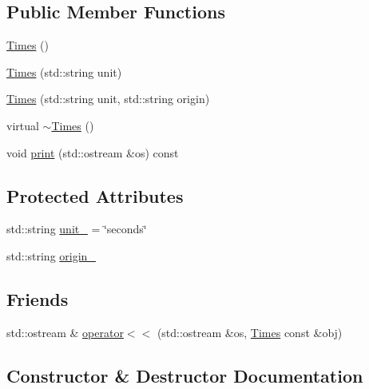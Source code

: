 \subsection*{Public Member Functions}
\begin{DoxyCompactItemize}
\item 
\mbox{\hyperlink{class_times_a8ba246100f3c12f80abeb3beb93446f6}{Times}} ()
\item 
\mbox{\hyperlink{class_times_a49de9639125c133a6b0e4351eaa422b5}{Times}} (std\+::string unit)
\item 
\mbox{\hyperlink{class_times_aec85fed5d7741b4ea2445874b3ecadfe}{Times}} (std\+::string unit, std\+::string origin)
\item 
virtual \mbox{\hyperlink{class_times_a7989831a284e9d10e3ae96ceb2349a3c}{$\sim$\+Times}} ()
\item 
void \mbox{\hyperlink{class_times_acdfa95279c544d2cee2f33415fe4909c}{print}} (std\+::ostream \&os) const
\end{DoxyCompactItemize}
\subsection*{Protected Attributes}
\begin{DoxyCompactItemize}
\item 
std\+::string \mbox{\hyperlink{class_times_a32130156e076d5511c44fc71ee68a980}{unit\+\_\+}} = \char`\"{}seconds\char`\"{}
\item 
std\+::string \mbox{\hyperlink{class_times_a7609195d9216105cad01df13230abfa9}{origin\+\_\+}}
\end{DoxyCompactItemize}
\subsection*{Friends}
\begin{DoxyCompactItemize}
\item 
std\+::ostream \& \mbox{\hyperlink{class_times_a0c37c7d9833e9b02d1a219555f55fe34}{operator$<$$<$}} (std\+::ostream \&os, \mbox{\hyperlink{class_times}{Times}} const \&obj)
\end{DoxyCompactItemize}


\subsection{Constructor \& Destructor Documentation}
\mbox{\label{class_times_a8ba246100f3c12f80abeb3beb93446f6}} 
